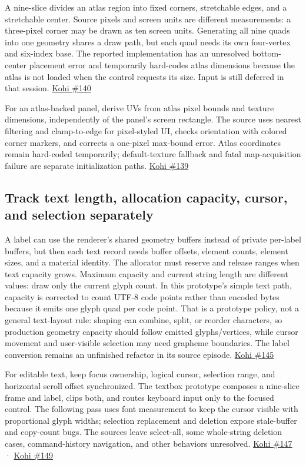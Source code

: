 A nine-slice divides an atlas region into fixed corners, stretchable edges, and a stretchable center. Source pixels and screen units are different measurements: a three-pixel corner may be drawn as ten screen units. Generating all nine quads into one geometry shares a draw path, but each quad needs its own four-vertex and six-index base. The reported implementation has an unresolved bottom-center placement error and temporarily hard-codes atlas dimensions because the atlas is not loaded when the control requests its size. Input is still deferred in that session. \href{https://www.youtube.com/watch?v=C_uF9W2niD0}{Kohi \#140}

For an atlas-backed panel, derive UVs from atlas pixel bounds and texture dimensions, independently of the panel's screen rectangle. The source uses nearest filtering and clamp-to-edge for pixel-styled UI, checks orientation with colored corner markers, and corrects a one-pixel max-bound error. Atlas coordinates remain hard-coded temporarily; default-texture fallback and fatal map-acquisition failure are separate initialization paths. \href{https://www.youtube.com/watch?v=-V5z1bVjl_c}{Kohi \#139}

\subsection{Track text length, allocation capacity, cursor, and selection separately}\label{05-engine-i-ch013-track-text-length-allocation-capacity-cursor-and-selection-separately}

A label can use the renderer's shared geometry buffers instead of private per-label buffers, but then each text record needs buffer offsets, element counts, element sizes, and a material identity. The allocator must reserve and release ranges when text capacity grows. Maximum capacity and current string length are different values: draw only the current glyph count. In this prototype's simple text path, capacity is corrected to count UTF-8 code points rather than encoded bytes because it emits one glyph quad per code point. That is a prototype policy, not a general text-layout rule: shaping can combine, split, or reorder characters, so production geometry capacity should follow emitted glyphs/vertices, while cursor movement and user-visible selection may need grapheme boundaries. The label conversion remains an unfinished refactor in its source episode. \href{https://www.youtube.com/watch?v=HXJbWldxfj0}{Kohi \#145}

For editable text, keep focus ownership, logical cursor, selection range, and horizontal scroll offset synchronized. The textbox prototype composes a nine-slice frame and label, clips both, and routes keyboard input only to the focused control. The following pass uses font measurement to keep the cursor visible with proportional glyph widths; selection replacement and deletion expose stale-buffer and copy-count bugs. The sources leave select-all, some whole-string deletion cases, command-history navigation, and other behaviors unresolved. \href{https://www.youtube.com/watch?v=faESVT5N9gg}{Kohi \#147} · \href{https://www.youtube.com/watch?v=aWv2-QSOuO8}{Kohi \#149}

